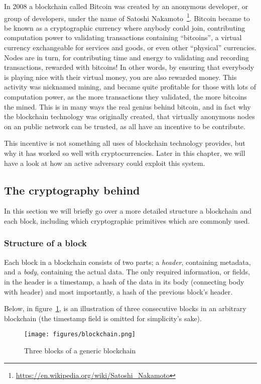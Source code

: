 In 2008 a blockchain called Bitcoin was created by an anonymous
developer, or group of developers, under the name of Satoshi
Nakamoto~\footnote{\url{https://en.wikipedia.org/wiki/Satoshi_Nakamoto}}.
Bitcoin became to be known as a cryptographic currency where anybody
could join, contributing computation power to validating transactions
containing ``bitcoins'', a virtual currency exchangeable for services
and goods, or even other ``physical'' currencies. Nodes are in turn,
for contributing time and energy to validating and recording
transactions, rewarded with bitcoins! In other words, by ensuring that
everybody is playing nice with their virtual money, you are also
rewarded money. This activity was nicknamed mining, and became quite
profitable for those with lots of computation power, as the more
transactions they validated, the more bitcoins the mined. This is in
many ways the real genius behind bitcoin, and in fact why the
blockchain technology was originally created, that virtually anonymous
nodes on an public network can be trusted, as all have an incentive to
be contribute.

This incentive is not something all uses of blockchain technology
provides, but why it has worked so well with cryptocurrencies. Later
in this chapter, we will have a look at how an active adversary could
exploit this system.


\subsection{The cryptography behind}
In this section we will briefly go over a more detailed structure a
blockchain and each block, including which cryptographic primitives
which are commonly used.

\subsubsection{Structure of a block}
Each block in a blockchain consists of two parts; a \textit{header},
containing metadata, and a \textit{body}, containing the actual data.
The only required information, or fields, in the header is a
timestamp, a hash of the data in its body (connecting body with
header) and most importantly, a hash of the previous block's header.

Below, in figure~\ref{fig:blockchain}, is an illustration of three
consecutive blocks in an arbitrary blockchain (the timestamp field is
omitted for simplicity's sake).
\begin{figure}[H]
  \centering
  \texttt{[image: figures/blockchain.png]}
  \caption{\label{fig:blockchain} Three blocks of a generic blockchain}
\end{figure}


